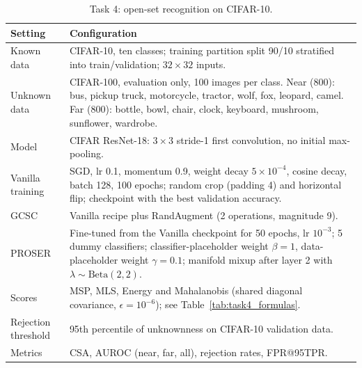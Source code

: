 \begin{table}[h]
  \caption{Task 4: open-set recognition on CIFAR-10.}
  \label{tab:setup_task4}
  \centering
  \small
  \begin{tabular}{@{}p{}p{}@{}}
    \toprule
    \textbf{Setting} & \textbf{Configuration} \\
    \midrule
    Known data & CIFAR-10, ten classes; training partition split 90/10 stratified into train/validation; $32\times32$ inputs. \\
    Unknown data & CIFAR-100, evaluation only, 100 images per class. Near (800): bus, pickup truck, motorcycle, tractor, wolf, fox, leopard, camel. Far (800): bottle, bowl, chair, clock, keyboard, mushroom, sunflower, wardrobe. \\
    Model & CIFAR ResNet-18: $3\times3$ stride-1 first convolution, no initial max-pooling. \\
    Vanilla training & SGD, lr 0.1, momentum 0.9, weight decay $5\times10^{-4}$, cosine decay, batch 128, 100 epochs; random crop (padding 4) and horizontal flip; checkpoint with the best validation accuracy. \\
    GCSC & Vanilla recipe plus RandAugment (2 operations, magnitude 9). \\
    PROSER & Fine-tuned from the Vanilla checkpoint for 50 epochs, lr $10^{-3}$; 5 dummy classifiers; classifier-placeholder weight $\beta=1$, data-placeholder weight $\gamma=0.1$; manifold mixup after layer 2 with $\lambda\sim\mathrm{Beta}(2,2)$. \\
    Scores & MSP, MLS, Energy and Mahalanobis (shared diagonal covariance, $\epsilon=10^{-6}$); see Table~\ref{tab:task4_formulas}. \\
    Rejection threshold & 95th percentile of unknownness on CIFAR-10 validation data. \\
    Metrics & CSA, AUROC (near, far, all), rejection rates, FPR@95TPR. \\
    \bottomrule
  \end{tabular}
\end{table}
